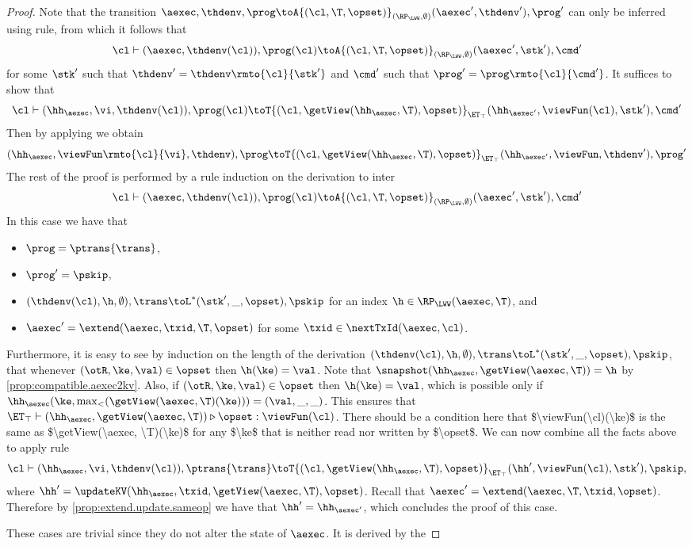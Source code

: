 \begin{proof}
Note that the transition 
$\aexec, \thdenv, \prog \toA{(\cl, \T, \opset)}_{(\RP_{\LWW}, \emptyset)} (\aexec', \thdenv'), \prog'$ 
can only be inferred using  rule, 
from which it follows that 
\[
    \cl \vdash (\aexec, \thdenv(\cl)), \prog(\cl) 
    \toA{(\cl, \T, \opset)}_{(\RP_{\LWW}, \emptyset)} (\aexec' ,\stk'), \cmd'
\]
for some $\stk'$ such that $\thdenv' = \thdenv\rmto{\cl}{\stk'}$ 
and $\cmd'$ such that $\prog' = \prog\rmto{\cl}{\cmd'}$.
It suffices to show that 
\[
    \cl \vdash (\hh_\aexec, \vi, \thdenv(\cl)), \prog(\cl) 
   \toT{(\cl, \getView(\hh_{\aexec}, \T), \opset)}_{\ET_{\top}} 
    (\hh_{\aexec'}, \viewFun(\cl), \stk'), \cmd'
\]
Then by applying  we obtain 
\[
    (\hh_{\aexec}, \viewFun\rmto{\cl}{\vi}, \thdenv), \prog 
    \toT{(\cl, \getView(\hh_{\aexec}, \T), \opset)}_{\ET_{\top}} 
    (\hh_{\aexec'}, \viewFun, \thdenv'), \prog'
\]
The rest of the proof is performed by a rule induction on the derivation to inter 
\[ 
    \cl \vdash (\aexec, \thdenv(\cl)), \prog(\cl) 
    \toA{(\cl, \T, \opset)}_{(\RP_{\LWW}, \emptyset)} (\aexec', \stk'), \cmd'
\]
In this case we have that 
\begin{itemize}
    \item $\prog = \ptrans{\trans}$, 
    \item $\prog' = \pskip$, 
    \item $(\thdenv(\cl), \h, \emptyset), \trans \toL^{\ast} (\stk', \_, \opset), \pskip$ for an index $\h \in \RP_{\LWW}(\aexec, \T)$, and 
    \item $\aexec' = \extend(\aexec, \txid, \T, \opset)$ for some $\txid \in \nextTxId(\aexec, \cl)$. 
\end{itemize}
Furthermore, it is easy to see by induction on the length of the derivation 
$(\thdenv(\cl), \h, \emptyset), \trans \toL^{\ast} (\stk', \_, \opset), \pskip$, 
that whenever $(\otR, \ke, \val) \in \opset$ then $\h(\ke) = \val$.
Note that $\snapshot(\hh_{\aexec}, \getView(\aexec, \T)) = \h$ by \cref{prop:compatible.aexec2kv}.
Also, if $(\otR,\ke, \val) \in \opset$ then $\h(\ke) = \val$, which is possible only if  
$\hh_{\aexec}(\ke, \max_{<}(\getView(\aexec, \T)(\ke))) = (\val, \_, \_)$.
This ensures that $\ET_{\top} \vdash (\hh_{\aexec}, \getView(\aexec, \T)) \triangleright \opset: \viewFun(\cl)$. 
\ac{There should be a condition here that $\viewFun(\cl)(\ke)$ is the same as $\getView(\aexec, \T)(\ke)$ 
for any $\ke$ that is neither read nor written by $\opset$.} 
We can now combine all the facts above to apply rule 
\[
    \cl \vdash (\hh_{\aexec}, \vi, \thdenv(\cl)), \ptrans{\trans}
    \toT{(\cl, \getView(\hh_{\aexec}, \T), \opset)}_{\ET_{\top}} 
    (\hh', \viewFun(\cl), \stk'), \pskip, 
\] 
where $\hh' = \updateKV(\hh_{\aexec}, \txid, \getView(\aexec, \T), \opset)$. 
Recall that $\aexec' = \extend(\aexec, \T, \txid, \opset)$. 
Therefore by \cref{prop:extend.update.sameop} we have that $\hh' = \hh_{\aexec'}$, 
which concludes the proof of this case.

These cases are trivial since they do not alter the state of \( \aexec \).
It is derived by the \ih
\end{proof}

